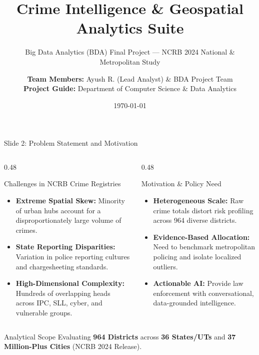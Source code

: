 \documentclass[aspectratio=169,10pt]{beamer}
\title[Crime Intelligence Suite]{Crime Intelligence \& Geospatial Analytics Suite}
\subtitle{Big Data Analytics (BDA) Final Project — NCRB 2024 National \& Metropolitan Study}
\author[BDA Project Team]{%
    \textbf{Team Members:} Ayush R. (Lead Analyst) \& BDA Project Team\\[2pt]
    \textbf{Project Guide:} Department of Computer Science \& Data Analytics
}
\institute[NCRB 2024 Study]{%
    Department of Computer Science \& Data Analytics\\
    National Crime Records Bureau (NCRB) 2024 Dataset Analysis
}
\date{\today}
\begin{document}
\begin{frame}[plain]
    \titlepage
\end{frame}

\begin{frame}{Slide 2: Problem Statement and Motivation}
    \begin{columns}[T]
        \begin{column}{0.48\textwidth}
            \begin{block}{Challenges in NCRB Crime Registries}
                \begin{itemize}
                    \item \textbf{Extreme Spatial Skew:} Minority of urban hubs account for a disproportionately large volume of crimes.
                    \item \textbf{State Reporting Disparities:} Variation in police reporting cultures and chargesheeting standards.
                    \item \textbf{High-Dimensional Complexity:} Hundreds of overlapping heads across IPC, SLL, cyber, and vulnerable groups.
                \end{itemize}
            \end{block}
        \end{column}
        \begin{column}{0.48\textwidth}
            \begin{block}{Motivation \& Policy Need}
                \begin{itemize}
                    \item \textbf{Heterogeneous Scale:} Raw crime totals distort risk profiling across 964 diverse districts.
                    \item \textbf{Evidence-Based Allocation:} Need to benchmark metropolitan policing and isolate localized outliers.
                    \item \textbf{Actionable AI:} Provide law enforcement with conversational, data-grounded intelligence.
                \end{itemize}
            \end{block}
        \end{column}
    \end{columns}

    \vspace{0.3cm}
    \begin{alertblock}{Analytical Scope}
        Evaluating \textbf{964 Districts} across \textbf{36 States/UTs} and \textbf{37 Million-Plus Cities} (NCRB 2024 Release).
    \end{alertblock}
\end{frame}
\end{document}
